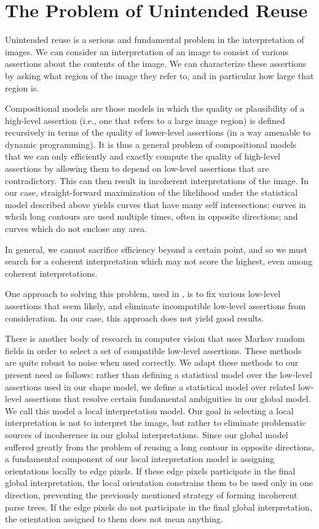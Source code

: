 \section{The Problem of Unintended Reuse}

Unintended reuse is a serious and fundamental problem in the
interpretation of images. We can consider an interpretation of an
image to consist of various assertions about the contents of the
image. We can characterize these assertions by asking what region of
the image they refer to, and in particular how large that region is.

Compositional models are those models in which the quality or
plausibility of a high-level assertion (i.e., one that refers to a
large image region) is defined recursively in terms of the quality of
lower-level assertions (in a way amenable to dynamic programming). It
is thus a general problem of compositional models that we can only
efficiently and exactly compute the quality of high-level assertions
by allowing them to depend on low-level assertions that are
contradictory. This can then result in incoherent interpretations of
the image. In our case, straight-forward maximization of the
likelihood under the statistical model described above yields curves
that have many self intersections; curves in whcih long contours are
used multiple times, often in opposite directions; and curves which do
not enclose any area.

In general, we cannot sacrifice efficiency beyond a certain point, and
so we must search for a coherent interpretation which may not score
the highest, even among coherent interpretations.

One approach to solving this problem, used in \cite{jin-geman},
is to fix various low-level assertions that seem likely, and eliminate
incompatible low-level assertions from consideration.
 In our case, this approach does not yield
good results. 

There is another body of research in computer vision that uses Markov
random fields in order to select a set of compatible low-level
assertions. These methods are quite robust to noise when used
correctly. We adapt these methods to our present need as follows:
rather than defining a statistical model over the low-level assertions
used in our shape model, we define a statistical model over related
low-level assertions that resolve certain fundamental ambiguities in
our global model. We call this model a local interpretation model. Our
goal in selecting a local interpretation is not to interpret the
image, but rather to eliminate problematic sources of incoherence in
our global interpretations. Since our global model suffered greatly
from the problem of reusing a long contour in opposite directions, a
fundamental component of our local interpretation model is assigning
orientations locally to edge pixels. If these edge pixels participate
in the final global interpretation, the local orientation constrains
them to be used only in one direction, preventing the previously
mentioned strategy of forming incoherent parse trees. If the edge
pixels do not participate in the final global interpretation, the
orientation assigned to them does not mean anything.

